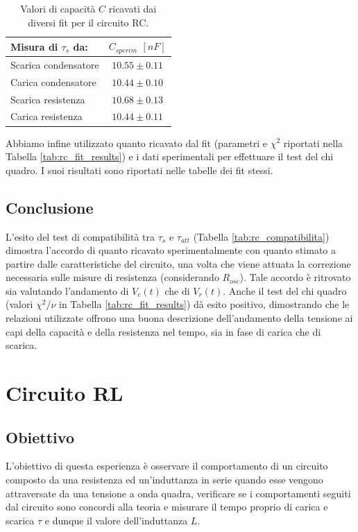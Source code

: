 \documentclass[a4paper]{article}
\begin{document}
\begin{table}[h!] %
\centering
\begin{tabular}{|l|c|}
\hline
Misura di $\tau_s$ da: & $C_{sperim}$ $[\si{nF}]$ \\ %
\hline
Scarica condensatore & $10.55 \pm 0.11$  \\
Carica condensatore & $10.44 \pm 0.10$ \\
Scarica resistenza & $10.68 \pm 0.13$ \\
Carica resistenza & $10.44 \pm 0.11$ \\
\hline
\end{tabular}
\caption{Valori di capacità $C$ ricavati dai diversi fit per il circuito RC.}
\label{tab:rc_capacita_ricavate}
\end{table}

Abbiamo infine utilizzato quanto ricavato dal fit (parametri e $\chi^2$ riportati nella Tabella \ref{tab:rc_fit_results}) e i dati sperimentali per effettuare il test del chi quadro. I suoi risultati sono riportati nelle tabelle dei fit stessi.

\subsection{Conclusione}
L'esito del test di compatibilità tra $\tau_s$ e $\tau_{att}$ (Tabella \ref{tab:rc_compatibilita}) dimostra l'accordo di quanto ricavato sperimentalmente con quanto stimato a partire dalle caratteristiche del circuito, una volta che viene attuata la correzione necessaria sulle misure di resistenza (considerando $R_{osc}$). Tale accordo è ritrovato sia valutando l'andamento di $V_c (t)$ che di $V_r (t)$. Anche il test del chi quadro (valori $\chi^2/\nu$ in Tabella \ref{tab:rc_fit_results}) dà esito positivo, dimostrando che le relazioni utilizzate offrono una buona descrizione dell'andamento della tensione ai capi della capacità e della resistenza nel tempo, sia in fase di carica che di scarica.


\section{Circuito RL}
\subsection{Obiettivo}
L'obiettivo di questa esperienza è osservare il comportamento di un circuito composto da una resistenza ed un'induttanza in serie quando esse vengono attraversate da una tensione a onda quadra, verificare se i comportamenti seguiti dal circuito sono concordi alla teoria e misurare il tempo proprio di carica e scarica \( \mathit{\tau} \) e dunque il valore dell'induttanza \( \mathit{L} \).
\end{document}
